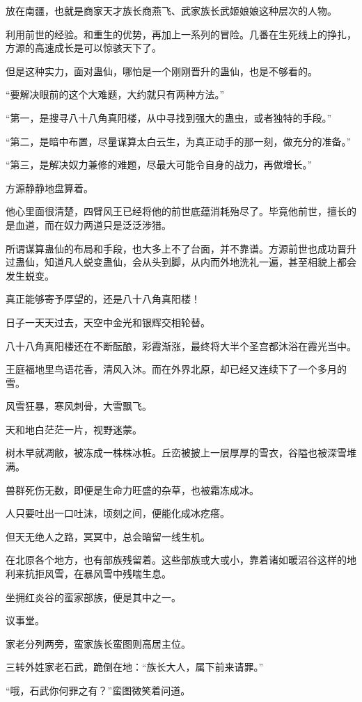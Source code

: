 \begin{this_body}
放在南疆，也就是商家天才族长商燕飞、武家族长武姬娘娘这种层次的人物。

利用前世的经验。和重生的优势，再加上一系列的冒险。几番在生死线上的挣扎，方源的高速成长是可以惊骇天下了。

但是这种实力，面对蛊仙，哪怕是一个刚刚晋升的蛊仙，也是不够看的。

“要解决眼前的这个大难题，大约就只有两种方法。”

“第一，是搜寻八十八角真阳楼，从中寻找到强大的蛊虫，或者独特的手段。”

“第二，是暗中布置，尽量谋算太白云生，为真正动手的那一刻，做充分的准备。”

“第三，是解决奴力兼修的难题，尽最大可能令自身的战力，再做增长。”

方源静静地盘算着。

他心里面很清楚，四臂风王已经将他的前世底蕴消耗殆尽了。毕竟他前世，擅长的是血道，而在奴力两道只是泛泛涉猎。

所谓谋算蛊仙的布局和手段，也大多上不了台面，并不靠谱。方源前世也成功晋升过蛊仙，知道凡人蜕变蛊仙，会从头到脚，从内而外地洗礼一遍，甚至相貌上都会发生蜕变。

真正能够寄予厚望的，还是八十八角真阳楼！

日子一天天过去，天空中金光和银辉交相轮替。

八十八角真阳楼还在不断酝酿，彩霞渐涨，最终将大半个圣宫都沐浴在霞光当中。

王庭福地里鸟语花香，清风入沐。而在外界北原，却已经又连续下了一个多月的雪。

风雪狂暴，寒风刺骨，大雪飘飞。

天和地白茫茫一片，视野迷蒙。

树木早就凋敝，被冻成一株株冰桩。丘峦被披上一层厚厚的雪衣，谷隘也被深雪堆满。

兽群死伤无数，即便是生命力旺盛的杂草，也被霜冻成冰。

人只要吐出一口吐沫，顷刻之间，便能化成冰疙瘩。

但天无绝人之路，冥冥中，总会暗留一线生机。

在北原各个地方，也有部族残留着。这些部族或大或小，靠着诸如暖沼谷这样的地利来抗拒风雪，在暴风雪中残喘生息。

坐拥红炎谷的蛮家部族，便是其中之一。

议事堂。

家老分列两旁，蛮家族长蛮图则高居主位。

三转外姓家老石武，跪倒在地：“族长大人，属下前来请罪。”

“哦，石武你何罪之有？”蛮图微笑着问道。


\end{this_body}
